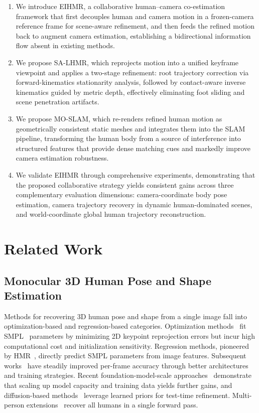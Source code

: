 \documentclass[runningheads]{llncs}
\begin{document}
\begin{enumerate}
\item We introduce EIHMR, a collaborative human--camera co-estimation framework that first decouples human and camera motion in a frozen-camera reference frame for scene-aware refinement, and then feeds the refined motion back to augment camera estimation, establishing a bidirectional information flow absent in existing methods.

\item We propose SA-LHMR, which reprojects motion into a unified keyframe viewpoint and applies a two-stage refinement: root trajectory correction via forward-kinematics stationarity analysis, followed by contact-aware inverse kinematics guided by metric depth, effectively eliminating foot sliding and scene penetration artifacts.

\item We propose MO-SLAM, which re-renders refined human motion as geometrically consistent static meshes and integrates them into the SLAM pipeline, transforming the human body from a source of interference into structured features that provide dense matching cues and markedly improve camera estimation robustness.

\item We validate EIHMR through comprehensive experiments, demonstrating that the proposed collaborative strategy yields consistent gains across three complementary evaluation dimensions: camera-coordinate body pose estimation, camera trajectory recovery in dynamic human-dominated scenes, and world-coordinate global human trajectory reconstruction.
\end{enumerate}


\section{Related Work}
\label{sec:related}

\subsection{Monocular 3D Human Pose and Shape Estimation}
Methods for recovering 3D human pose and shape from a single image fall into optimization-based and regression-based categories. Optimization methods~\cite{SMPLify2016,NIKI2023} fit SMPL~\cite{SMPL} parameters by minimizing 2D keypoint reprojection errors but incur high computational cost and initialization sensitivity. Regression methods, pioneered by HMR~\cite{HMR2018}, directly predict SMPL parameters from image features. Subsequent works~\cite{PyMAF2021,CLIFF2022,TokenHMR2024} have steadily improved per-frame accuracy through better architectures and training strategies. Recent foundation-model-scale approaches~\cite{HMR2024,SMPLerX2024,Sapiens2024} demonstrate that scaling up model capacity and training data yields further gains, and diffusion-based methods~\cite{ScoreHMR2024} leverage learned priors for test-time refinement. Multi-person extensions~\cite{MultiHMR2024} recover all humans in a single forward pass.
\end{document}
